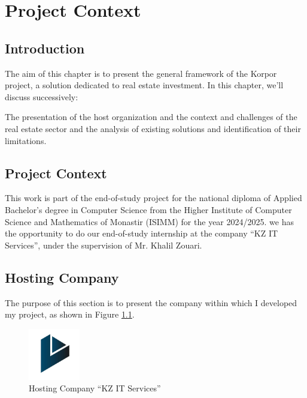 \chapter{Project Context}

\section*{Introduction}

The aim of this chapter is to present the general framework of the Korpor project, a solution dedicated to real estate investment. In this chapter, we'll discuss successively:

The presentation of the host organization and the context and challenges of the real estate sector and the analysis of existing solutions and identification of their limitations.


\section{Project Context}

This work is part of the end-of-study project for the national diploma of Applied Bachelor's degree in Computer Science from the Higher Institute of Computer Science and Mathematics of Monastir (ISIMM) for the year 2024/2025. we has the opportunity to do our end-of-study internship at the company
``KZ IT Services'', under the supervision of Mr. Khalil Zouari.

\section{Hosting Company}

The purpose of this section is to present the company within which I developed my project, as shown in Figure \ref{fig:hosting-company}.

\begin{figure}[htbp]
    \centering
    \includegraphics[width=0.2\textwidth]{images/company-logo.png}
    \caption{Hosting Company ``KZ IT Services''}
    \label{fig:hosting-company}
\end{figure}

